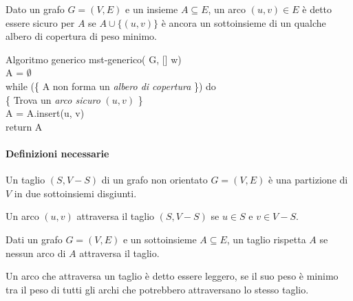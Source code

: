 \begin{definition}
    Dato un grafo $G=(V,E)$ e un insieme $A\subseteq E$, un arco $(u,v)\in E$ è
    detto essere sicuro per $A$ se $A\cup\{(u,v)\}$ è ancora un sottoinsieme di
    un qualche albero di copertura di peso minimo.
\end{definition}

\begin{minicode}{Algoritmo generico}
    \ind{} mst-generico( G, [] w)\\
         A = $\emptyset$\\
        \indf while (\{ A non forma un \emph{albero di copertura} \}) do\\
            \{ Trova un \emph{arco sicuro} $(u,v)$ \}\\
            A = A.insert(u, v)\\
        \indf return A
\end{minicode}

\paragraph{Definizioni necessarie}
\begin{definition}[Taglio]
    Un taglio $(S, V-S)$ di un grafo non orientato $G=(V,E)$ è una partizione di
    $V$ in due sottoinsiemi disgiunti.
\end{definition}
\begin{definition}
    Un arco $(u,v)$ attraversa il taglio $(S,V-S)$ se $u\in S$ e $v\in V-S$.
\end{definition}
\begin{definition}
    Dati un grafo $G=(V,E)$ e un sottoinsieme $A\subseteq E$, un taglio rispetta
    $A$ se nessun arco di $A$ attraversa il taglio.
\end{definition}
\begin{definition}
    Un arco che attraversa un taglio è detto essere leggero, se il suo peso è
    minimo tra il peso di tutti gli archi che potrebbero attraversano lo stesso
    taglio.
\end{definition}

